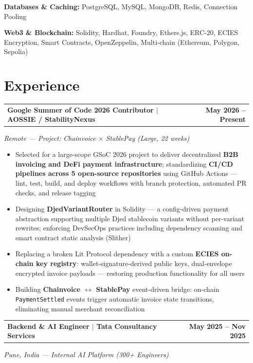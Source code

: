 \documentclass[a4paper,10pt]{article}
\begin{document}
\textbf{Databases \& Caching:} PostgreSQL, MySQL, MongoDB, Redis, Connection Pooling

\textbf{Web3 \& Blockchain:} Solidity, Hardhat, Foundry, Ethers.js, ERC-20, ECIES Encryption, Smart Contracts, OpenZeppelin, Multi-chain (Ethereum, Polygon, Sepolia)

\section{Experience}

\begin{tabularx}{\linewidth}{@{}X r@{}}
\textbf{Google Summer of Code 2026 Contributor $|$ AOSSIE / StabilityNexus} &
\textbf{May 2026 -- Present}
\end{tabularx}
{\small\textit{Remote --- Project: Chainvoice $\times$ StablePay (Large, 22 weeks)}}

\begin{itemize}
\item Selected for a large-scope GSoC 2026 project to deliver decentralized \textbf{B2B invoicing and DeFi payment infrastructure}; standardizing \textbf{CI/CD pipelines across 5 open-source repositories} using GitHub Actions --- lint, test, build, and deploy workflows with branch protection, automated PR checks, and release tagging
\item Designing \textbf{DjedVariantRouter} in Solidity --- a config-driven payment abstraction supporting multiple Djed stablecoin variants without per-variant rewrites; enforcing DevSecOps practices including dependency scanning and smart contract static analysis (Slither)
\item Replacing a broken Lit Protocol dependency with a custom \textbf{ECIES on-chain key registry}: wallet-signature-derived public keys, dual-envelope encrypted invoice payloads --- restoring production functionality for all users
\item Building \textbf{Chainvoice $\leftrightarrow$ StablePay} event-driven bridge: on-chain \texttt{PaymentSettled} events trigger automatic invoice state transitions, eliminating manual merchant reconciliation
\end{itemize}

\begin{tabularx}{\linewidth}{@{}X r@{}}
\textbf{Backend \& AI Engineer $|$ Tata Consultancy Services} &
\textbf{May 2025 -- Nov 2025}
\end{tabularx}
{\small\textit{Pune, India --- Internal AI Platform (300+ Engineers)}}
\end{document}
